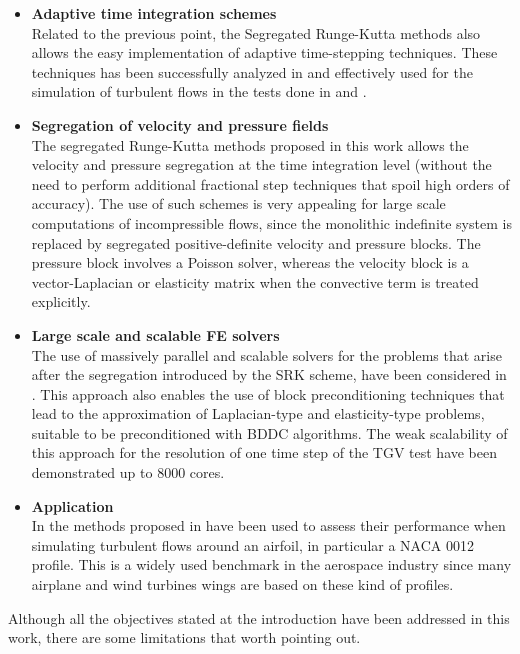 \begin{itemize}
\item {\bf Adaptive time integration schemes}\\
Related to the previous point, the Segregated Runge-Kutta methods also allows the easy implementation of adaptive time-stepping techniques. These techniques has been successfully analyzed in  and effectively used for the simulation of turbulent flows in the tests done in  and .

\item {\bf Segregation of velocity and pressure fields}\\
The segregated Runge-Kutta methods proposed in this work allows the velocity and pressure segregation at the time integration level (without the need to perform additional fractional step techniques that spoil high orders of accuracy). The use of such schemes is very appealing for large scale computations of incompressible flows, since the monolithic indefinite system is replaced by segregated positive-definite velocity and pressure blocks. The pressure block involves a Poisson solver, whereas the velocity block is a vector-Laplacian or elasticity matrix when the convective term is treated explicitly.

\item {\bf Large scale and scalable FE solvers}\\
The use of massively parallel and scalable solvers for the problems that arise after the segregation introduced by the SRK scheme, have been considered in . This approach also enables the use of block preconditioning techniques that lead to the approximation of Laplacian-type and elasticity-type problems, suitable to be preconditioned with BDDC algorithms. The weak scalability of this approach for the resolution of one time step of the TGV test have been demonstrated up to 8000 cores.

\item {\bf Application}\\
In  the methods proposed in  have been used to assess their performance when simulating turbulent flows around an airfoil, in particular a NACA 0012 profile. This is a widely used  benchmark in the aerospace industry since many airplane and wind turbines wings are based on these kind of profiles.

\end{itemize}

Although all the objectives stated at the introduction have been addressed in this work, there are some limitations that worth pointing out. 

